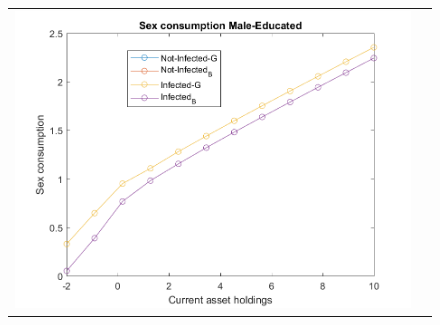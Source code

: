 \begin{figure}[H]
\begin{center}
\begin{tabular}{cc}
\includegraphics[angle=0,width=.5\textwidth]{figures/FIG4.png} \\
\end{tabular}
\end{center}
\label{fig:2}
\end{figure}

